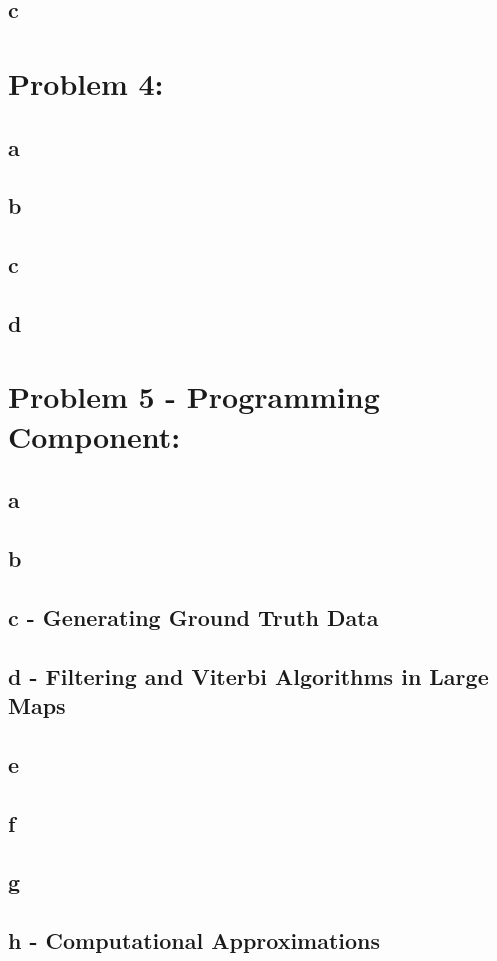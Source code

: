 \documentclass[11pt, oneside]{article}   	%
\begin{document}
\begin{flushleft}
\subsection*{c}
\section*{Problem 4:}
\subsection*{a}
\subsection*{b}
\subsection*{c}
\subsection*{d}
\section*{Problem 5 - Programming Component:}
\subsection*{a}
\subsection*{b}
\subsection*{c - Generating Ground Truth Data}
\subsection*{d - Filtering and Viterbi Algorithms in Large Maps}
\subsection*{e}
\subsection*{f}
\subsection*{g}
\subsection*{h - Computational Approximations}
\end{flushleft}
\end{document}

